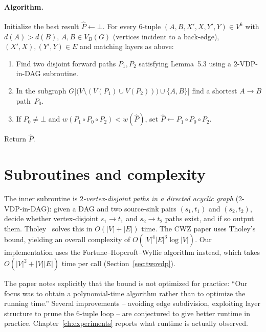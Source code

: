 \paragraph{Algorithm.} Initialize the best result $\widehat P\gets\bot$.
For every $6$-tuple $(A,B,X',X,Y',Y)\in V^{6}$ with $d(A)>d(B)$,
$A,B\in V_B(G)$ (vertices incident to a back-edge), $(X',X),(Y',Y)\in E$ and
matching layers as above:
\begin{enumerate}
  \item Find two disjoint forward paths $P_1,P_2$ satisfying Lemma~5.3 using
    a $2$-VDP-in-DAG subroutine.
  \item In the subgraph $G\bigl[\bigl(V\setminus(V(P_1)\cup
    V(P_2))\bigr)\cup\{A,B\}\bigr]$ find a shortest $A\to B$ path~$P_0$.
  \item If $P_0\neq\bot$ and $w(P_1\circ P_0\circ P_2)<w(\widehat P)$, set
    $\widehat P\gets P_1\circ P_0\circ P_2$.
\end{enumerate}
Return $\widehat P$.

\section{Subroutines and complexity}

The inner subroutine is \emph{$2$-vertex-disjoint paths in a directed acyclic
graph} (2-VDP-in-DAG): given a DAG and two source-sink pairs $(s_1,t_1)$ and
$(s_2,t_2)$, decide whether vertex-disjoint $s_1\to t_1$ and $s_2\to t_2$
paths exist, and if so output them. Tholey~\cite{Tholey2012} solves this in
$O(|V|+|E|)$ time. The CWZ paper uses Tholey's bound, yielding an overall
complexity of $O(|V|^{4}|E|^{3}\log|V|)$. Our implementation uses the
Fortune--Hopcroft--Wyllie algorithm instead, which takes
$O(|V|^{2}+|V||E|)$ time per call (Section~\ref{sec:twovdp}).

The paper notes explicitly that the bound is not optimized for practice:
``Our focus was to obtain a polynomial-time algorithm rather than to optimize
the running time.'' Several improvements -- avoiding edge subdivision,
exploiting layer structure to prune the $6$-tuple loop -- are conjectured
to give better runtime in practice. Chapter~\ref{ch:experiments} reports
what runtime is actually observed.
